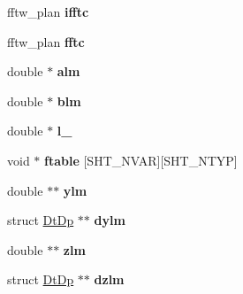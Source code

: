 \begin{DoxyCompactItemize}
\item 
\hypertarget{structshtns__info_a7932a301d56a4efd84e53be3d711dc3e}{}fftw\+\_\+plan {\bfseries ifftc}\label{structshtns__info_a7932a301d56a4efd84e53be3d711dc3e}

\item 
\hypertarget{structshtns__info_a2295a1b3a7c7721aa0fac015065db7eb}{}fftw\+\_\+plan {\bfseries fftc}\label{structshtns__info_a2295a1b3a7c7721aa0fac015065db7eb}

\item 
\hypertarget{structshtns__info_a2c988173d41df7efc015cfc4d83a3271}{}double $\ast$ {\bfseries alm}\label{structshtns__info_a2c988173d41df7efc015cfc4d83a3271}

\item 
\hypertarget{structshtns__info_a899cb9483aca3e84b7ff34cd97732937}{}double $\ast$ {\bfseries blm}\label{structshtns__info_a899cb9483aca3e84b7ff34cd97732937}

\item 
\hypertarget{structshtns__info_a6c6166880ea7087b4eabcfb7cde109bd}{}double $\ast$ {\bfseries l\+\_}\label{structshtns__info_a6c6166880ea7087b4eabcfb7cde109bd}

\item 
\hypertarget{structshtns__info_ab2247921a83d5c95ae45103cc32d5f85}{}void $\ast$ {\bfseries ftable} \mbox{[}S\+H\+T\+\_\+\+N\+V\+A\+R\mbox{]}\mbox{[}S\+H\+T\+\_\+\+N\+T\+Y\+P\mbox{]}\label{structshtns__info_ab2247921a83d5c95ae45103cc32d5f85}

\item 
\hypertarget{structshtns__info_afe932b193a8aa72dd29b2ac96b6fea0d}{}double $\ast$$\ast$ {\bfseries ylm}\label{structshtns__info_afe932b193a8aa72dd29b2ac96b6fea0d}

\item 
\hypertarget{structshtns__info_af475223d5467fb16eff55a29146dd1dd}{}struct \hyperlink{structDtDp}{Dt\+Dp} $\ast$$\ast$ {\bfseries dylm}\label{structshtns__info_af475223d5467fb16eff55a29146dd1dd}

\item 
\hypertarget{structshtns__info_a3ecae5d8bbdb01fb4a72d8452a930f1a}{}double $\ast$$\ast$ {\bfseries zlm}\label{structshtns__info_a3ecae5d8bbdb01fb4a72d8452a930f1a}

\item 
\hypertarget{structshtns__info_a903ed684909b80e2899f5e0fb5a52a93}{}struct \hyperlink{structDtDp}{Dt\+Dp} $\ast$$\ast$ {\bfseries dzlm}\label{structshtns__info_a903ed684909b80e2899f5e0fb5a52a93}


\end{DoxyCompactItemize}
